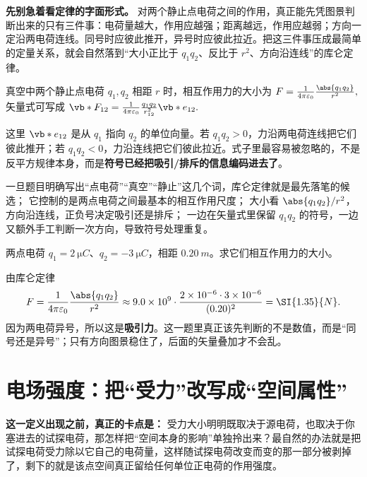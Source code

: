 \documentclass[lang=cn,11pt]{elegantbook}
\begin{document}
\textbf{先别急着看定律的字面形式。} 对两个静止点电荷之间的作用，真正能先凭图景判断出来的只有三件事：电荷量越大，作用应越强；距离越远，作用应越弱；方向一定沿两电荷连线。同号时应彼此推开，异号时应彼此拉近。把这三件事压成最简单的定量关系，就会自然落到“大小正比于 \(q_1q_2\)、反比于 \(r^2\)、方向沿连线”的库仑定律。

\begin{theorem}[库仑定律]
真空中两个静止点电荷 \(q_1,q_2\) 相距 \(r\) 时，相互作用力的大小为
 \(F=\frac{1}{4\pi\varepsilon_0}\frac{\abs{q_1q_2}}{r^2},\) 
矢量式可写成
 \(\vb*{F}_{12} =\frac{1}{4\pi\varepsilon_0}\frac{q_1q_2}{r_{12}^2}\vb*{e}_{12}.\) 
\end{theorem}

这里 \(\vb*{e}_{12}\) 是从 \(q_1\) 指向 \(q_2\) 的单位向量。若 \(q_1q_2>0\)，力沿两电荷连线把它们彼此推开；若 \(q_1q_2<0\)，力沿连线把它们彼此拉近。式子里最容易被忽略的，不是反平方规律本身，而是\textbf{符号已经把吸引/排斥的信息编码进去了}。

\begin{note}
 一旦题目明确写出“点电荷”“真空”“静止”这几个词，库仑定律就是最先落笔的候选； 它控制的是两点电荷之间最基本的相互作用尺度； 大小看 \(\abs{q_1q_2}/r^2\)，方向沿连线，正负号决定吸引还是排斥； 一边在矢量式里保留 \(q_1q_2\) 的符号，一边又额外手工判断一次方向，导致符号处理重复。
\end{note}

\begin{exercise}
两点电荷 \(q_1=\SI{2}{\micro C}\)、\(q_2=-\SI{3}{\micro C}\)，相距 \(\SI{0.20}{m}\)。求它们相互作用力的大小。
\end{exercise}

\begin{solution}
由库仑定律
\[
F=\frac{1}{4\pi\varepsilon_0}\frac{\abs{q_1q_2}}{r^2}
\approx 9.0\times 10^9\cdot \frac{2\times 10^{-6}\cdot 3\times 10^{-6}}{(0.20)^2}
=\SI{1.35}{N}.
\]
因为两电荷异号，所以这是\textbf{吸引力}。这一题里真正该先判断的不是数值，而是“同号还是异号”；只有方向图景稳住了，后面的矢量叠加才不会乱。
\end{solution}

\section{电场强度：把“受力”改写成“空间属性”}

\textbf{这一定义出现之前，真正的卡点是：} 受力大小明明既取决于源电荷，也取决于你塞进去的试探电荷，那怎样把“空间本身的影响”单独拎出来？最自然的办法就是把试探电荷受力除以它自己的电荷量，这样随试探电荷改变而变的那一部分被剥掉了，剩下的就是该点空间真正留给任何单位正电荷的作用强度。
\end{document}
